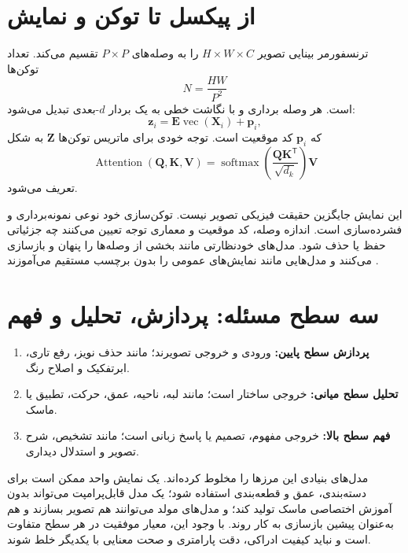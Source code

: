 \documentclass[12pt,openany,oneside]{book}
\newcommand{\trans}{^{\mathsf T}}
\newcommand{\vect}[1]{\bm{#1}}
\begin{document}
\section{از پیکسل تا توکن و نمایش}

ترنسفورمر بینایی تصویر \(H\times W\times C\) را به وصله‌های \(P\times P\) تقسیم می‌کند.
تعداد توکن‌ها
\begin{equation}
N=\frac{HW}{P^2}
\end{equation}
است. هر وصله برداری و با نگاشت خطی به یک بردار \(d\)-بعدی تبدیل می‌شود:
\begin{equation}
\vect z_i=\vect E\operatorname{vec}(\vect X_i)+\vect p_i,
\end{equation}
که \(\vect p_i\) کد موقعیت است. توجه خودی برای ماتریس توکن‌ها \(\vect Z\) به شکل
\begin{equation}
\operatorname{Attention}(\vect Q,\vect K,\vect V)
=\operatorname{softmax}\left(\frac{\vect Q\vect K\trans}{\sqrt{d_k}}\right)\vect V
\end{equation}
تعریف می‌شود.

این نمایش جایگزین حقیقت فیزیکی تصویر نیست. توکن‌سازی خود نوعی نمونه‌برداری و فشرده‌سازی است.
اندازه وصله، کد موقعیت و معماری توجه تعیین می‌کنند چه جزئیاتی حفظ یا حذف شود.
مدل‌های خودنظارتی مانند  بخشی از وصله‌ها را پنهان و بازسازی می‌کنند و مدل‌هایی مانند
 نمایش‌های عمومی را بدون برچسب مستقیم می‌آموزند \cite{he2022mae,oquab2024dinov2}.

\section{سه سطح مسئله: پردازش، تحلیل و فهم}

\begin{enumerate}
\item \textbf{پردازش سطح پایین:} ورودی و خروجی تصویرند؛ مانند حذف نویز، رفع تاری، ابرتفکیک و اصلاح رنگ.
\item \textbf{تحلیل سطح میانی:} خروجی ساختار است؛ مانند لبه، ناحیه، عمق، حرکت، تطبیق یا ماسک.
\item \textbf{فهم سطح بالا:} خروجی مفهوم، تصمیم یا پاسخ زبانی است؛ مانند تشخیص، شرح تصویر و استدلال دیداری.
\end{enumerate}

مدل‌های بنیادی این مرزها را مخلوط کرده‌اند. یک نمایش واحد ممکن است برای دسته‌بندی، عمق و قطعه‌بندی استفاده شود؛
یک مدل قابل‌پرامپت می‌تواند بدون آموزش اختصاصی ماسک تولید کند؛ و مدل‌های مولد می‌توانند هم تصویر بسازند و هم
به‌عنوان پیشین بازسازی به کار روند. با وجود این، معیار موفقیت در هر سطح متفاوت است و نباید کیفیت ادراکی،
دقت پارامتری و صحت معنایی با یکدیگر خلط شوند.
\end{document}
